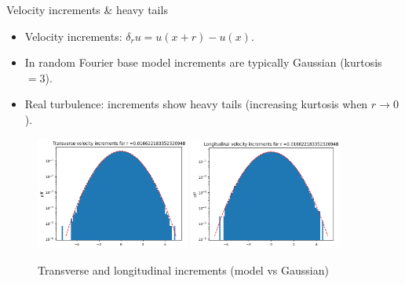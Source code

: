\documentclass[11pt]{beamer}
\begin{document}
\begin{frame}{Velocity increments \& heavy tails}
  \begin{itemize}
    \item Velocity increments: $\delta_r u = u(x+r)-u(x)$.
    \item In random Fourier base model increments are typically Gaussian (kurtosis $=3$).
    \item Real turbulence: increments show heavy tails (increasing kurtosis when $r\to 0$).
  \end{itemize}
  \begin{figure}
    \centering
    \includegraphics[width=0.45\textwidth]{illustrations/TransVelIncrExample.png}
    \includegraphics[width=0.45\textwidth]{illustrations/LongVelIncrExample.png}
    \caption{Transverse and longitudinal increments (model vs Gaussian)}
  \end{figure}
\end{frame}

\end{document}
